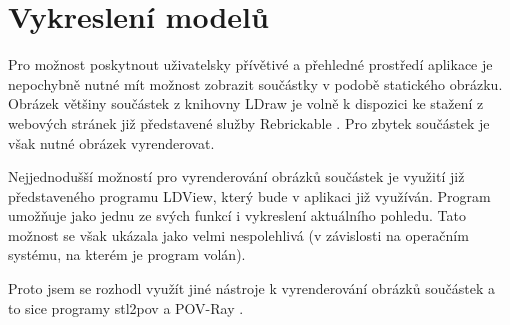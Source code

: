 \section{Vykreslení modelů}\label{reserse-vykresleni}
Pro možnost poskytnout uživatelsky přívětivé a přehledné prostředí aplikace je nepochybně nutné mít možnost zobrazit součástky v podobě statického obrázku. Obrázek většiny součástek z knihovny LDraw je volně k dispozici ke stažení z webových stránek již představené služby Rebrickable \autocite{rebrickable:download}. Pro zbytek součástek je však nutné obrázek vyrenderovat. 

Nejjednodušší možností pro vyrenderování obrázků součástek je využití již představeného programu LDView, který bude v aplikaci již využíván. Program umožňuje jako jednu ze svých funkcí i vykreslení aktuálního pohledu. Tato možnost se však ukázala jako velmi nespolehlivá (v závislosti na operačním systému, na kterém je program volán).

Proto jsem se rozhodl využít jiné nástroje k vyrenderování obrázků součástek a to sice programy stl2pov \autocite{stl2pov} a POV-Ray \autocite{povray}.

